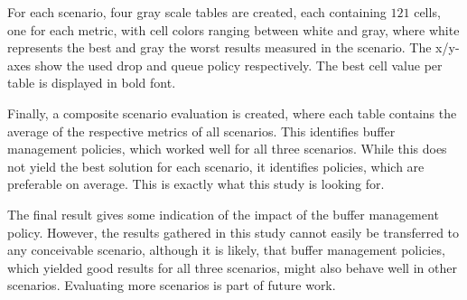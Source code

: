 \documentclass[conference,10pt,letterpaper,final]{IEEEtran}
\begin{document}
For each scenario, four gray scale tables are created, each containing $121$ cells, one for each metric, with cell colors ranging between white and gray, where white represents the best and gray the worst results measured in the scenario.
The x/y-axes show the used drop and queue policy respectively.
The best cell value per table is displayed in bold font.

Finally, a composite scenario evaluation is created, where each table contains the average of the respective metrics of all scenarios.
This identifies buffer management policies, which worked well for all three scenarios.
While this does not yield the best solution for each scenario, it identifies policies, which are preferable on average.
This is exactly what this study is looking for.

The final result gives some indication of the impact of the buffer management policy.
However, the results gathered in this study cannot easily be transferred to any conceivable scenario, although it is likely, that buffer management policies, which yielded good results for all three scenarios, might also behave well in other scenarios.
Evaluating more scenarios is part of future work.

\end{document}
